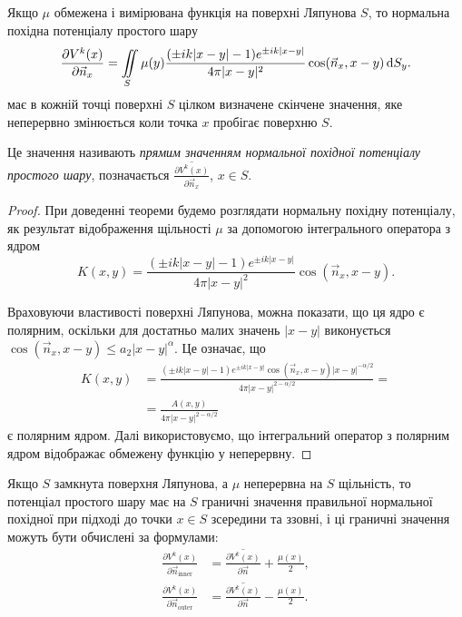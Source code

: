 \begin{theorem}
	Якщо $\mu$ обмежена і вимірювана функція на поверхні Ляпунова $S$, то нормальна похідна потенціалу простого шару
	\begin{equation}
		\frac{\partial V^k(x)}{\partial \vec n_x} = \displaystyle\iint\limits_S \mu(y) \frac{(\pm i k |x - y| - 1) e^{\pm i k |x - y|}}{4 \pi |x - y|^2} \cos(\vec n_x, x - y) \mathop{}\!\mathrm{d} S_y.
	\end{equation}
	має в кожній точці поверхні $S$ цілком визначене скінчене значення, яке неперервно змінюється коли точка $x$ пробігає поверхню $S$.
\end{theorem}

\begin{definition}
	Це значення називають \textit{прямим значенням нормальної похідної потенціалу простого шару}, позначається $\overline{\frac{\partial V^k(x)}{\partial \vec n_x}}$, $x \in S$. 
\end{definition}

\begin{proof}
	При доведенні теореми будемо розглядати нормальну похідну потенціалу, як результат відображення щільності $\mu$ за допомогою інтегрального оператора з ядром
	\begin{equation}
		K(x, y) = \frac{(\pm i k |x - y| - 1) e^{\pm i k |x - y|}}{4 \pi |x - y|^2} \cos(\vec n_x, x - y).
	\end{equation}

	Враховуючи властивості поверхні Ляпунова, можна показати, що ця ядро є полярним, оскільки для достатньо малих значень $|x - y|$ виконується $\cos(\vec n_x, x - y) \le a_2 |x - y|^\alpha$. Це означає, що
	\begin{equation}
		\begin{aligned}
			K(x, y) &= \frac{(\pm i k |x - y| - 1) e^{\pm i k |x - y|} \cos(\vec n_x, x - y) |x - y|^{-\alpha/2}}{4 \pi |x - y|^{2 - \alpha/2}} = \\
			&= \frac{A(x, y)}{4 \pi |x - y|^{2 - \alpha/2}}
		\end{aligned}
	\end{equation}
	є полярним ядром. Далі використовуємо, що інтегральний оператор з полярним ядром відображає обмежену функцію у неперервну.
\end{proof}

\begin{theorem}
	Якщо $S$ замкнута поверхня Ляпунова, а $\mu$ неперервна на $S$ щільність, то потенціал простого шару має на $S$ граничні значення правильної нормальної похідної при підході до точки $x \in S$ зсередини та ззовні, і ці граничні значення можуть бути обчислені за формулами: 
	\begin{align}
		\frac{\partial V^k(x)}{\partial \vec n_{\text{inner}}} &= \overline{\frac{\partial V^k(x)}{\partial \vec n}} + \frac{\mu(x)}{2}, \\
		\frac{\partial V^k(x)}{\partial \vec n_{\text{outer}}} &= \overline{\frac{\partial V^k(x)}{\partial \vec n}} - \frac{\mu(x)}{2}.
	\end{align}
\end{theorem}

